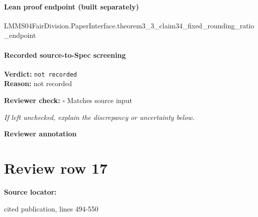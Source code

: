 \documentclass[10pt]{article}
\newcommand{\reviewerbox}{%
  \par\noindent\fbox{\parbox{0.96\linewidth}{\rule{0pt}{0.38in}}}\par
}
\newcommand{\reviewmatch}[1]{%
  \par\noindent\textbf{Reviewer check:} $\square$\; #1\par
  \noindent\emph{If left unchecked, explain the discrepancy or uncertainty below.}\par
}
\begin{document}
\paragraph{Lean proof endpoint (built separately)}\begin{ReviewVerbatim}
LMMS04FairDivision.PaperInterface.theorem3_3_claim34_fixed_rounding_ratio_endpoint
\end{ReviewVerbatim}

\paragraph{Recorded source-to-Spec screening}
\textbf{Verdict:} \texttt{not recorded}
\\
\textbf{Reason:} not recorded
\reviewmatch{Matches source input}
\noindent\textbf{Reviewer annotation}\par
\reviewerbox
\clearpage
\hypertarget{source-claim-b87e6866c2239b5c}{}
\section*{Review row 17}
\textbf{Source locator:} {\footnotesize\raggedright cited publication, lines 494-\allowbreak{}550\par}
\end{document}
